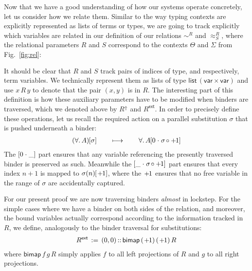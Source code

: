 \documentclass[a4paper,UKenglish]{lipics-v2016}
\newcommand{\ms}{\,}
\newcommand{\mrel}[1]{\mathrel{\ms #1 \ms}}
\newcommand{\eqdef}{\mrel{:=}}
\newcommand{\ty}{\mathsf{ty}}
\newcommand{\tm}{\mathsf{tm}}
\newcommand{\tyr}{\mathrel{\sim}}
\newcommand{\tmr}{\mathrel{\approx}}
\newcommand{\Rext}[1]{\ensuremath{#1^{\mathsf{ext}}}}
\newcommand{\Rshift}[1]{\ensuremath{#1^{\Uparrow}}}
\newcommand{\Prp}{\ensuremath{\textrm{\textasteriskcentered}}}
\newcommand{\All}{\ensuremath{\forall.\,}}
\newcommand{\Lam}[1]{\ensuremath{\lambda #1.\,}}
\newcommand{\TyLam}{\ensuremath{\Lambda.\,}}
\newcommand{\Prod}[1]{\ensuremath{\Pi #1.\,}}
\newcommand{\subst}[1]{\hphantom{|}\!\![{#1}]}
\newcommand{\scons}{\mathbin{\hspace{0.05em}\cdot\hspace{0.05em}}}
\newcommand{\scomp}{\mathbin{\hspace{-0.1em}{\circ}\hspace{-0.1em}}}
\newcommand{\shift}{\ensuremath{\hspace{0.1em}\mathsf{+}\hspace{0.08em}\!1}}
\theoremstyle{plain}
\begin{document}
Now that we have a good understanding of how our systems operate concretely, let us consider how we relate them.
Similar to the way typing contexts are explicitly represented as lists of terms or types, we are going to track explicitly which variables are related in our definition of our relations $\tyr^R$ and $\tmr^R_S$, where the relational parameters $R$ and $S$ correspond to the contexts $\Theta$ and $\Sigma$ from Fig.~\ref{fig:rel}:
It should be clear that $R$ and $S$ track pairs of indices of type, and respectively, term variables.
We technically represent them as lists of type $\mathsf{list}\,(\mathsf{var} \times \mathsf{var})$ and use $x\,R\,y$ to denote that the pair $(x,y)$ is in $R$.
The interesting part of this definition is how these auxiliary parameters have to be modified when binders are traversed, which we denoted above by $\Rshift{R}$ and $\Rext{R}$.
In order to precisely define these operations, let us recall the required action on a parallel substitution $\sigma$ that is pushed underneath a binder:
\begin{align*}
  (\All A)\subst{\sigma} \qquad\longmapsto\qquad \All A\subst{0 \scons \sigma \scomp \shift}
\end{align*}
The $\subst{0 \scons \_}$ part ensures that any variable referencing the presently traversed binder is preserved as such.
Meanwhile the $\subst{\_ \scons \sigma \scomp \shift}$ part ensures that every index $n + 1$ is mapped to $\sigma(n)\subst{\shift}$, where the $\shift$ ensures that no free variable in the range of $\sigma$ are accidentally captured.

For our present proof we are now traversing binders \emph{almost} in lockstep.
For the simple cases where we have a binder on both sides of the relation, and moreover, the bound variables actually correspond according to the information tracked in $R$, we define, analogously to the binder traversal for substitutions:
\begin{align*}
  \Rext{R} \eqdef (0,0) \mathop{::} \mathsf{bimap}\,(\shift)\,(\shift)\,R
\end{align*}
where $\mathsf{bimap}\,f\,g\,R$ simply applies $f$ to all left projections of $R$ and $g$ to all right projections.
\end{document}
